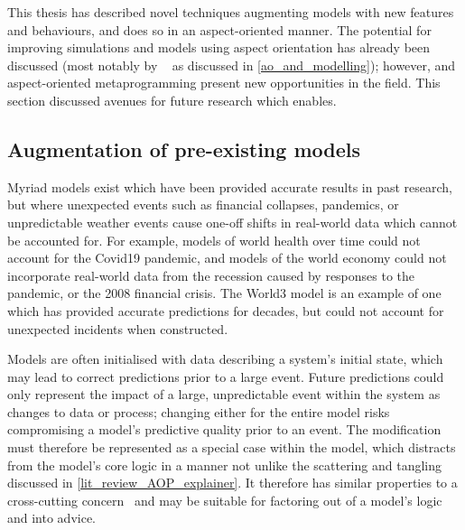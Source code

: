 This thesis has described novel techniques augmenting models with new features
and behaviours, and does so in an aspect-oriented manner. The potential for
improving simulations and models using aspect orientation has already been
discussed (most notably by \citeauthor{gulyas1999use}~\cite{gulyas1999use} as
discussed in \cref{ao_and_modelling}); however, \pdsf and aspect-oriented
metaprogramming present new opportunities in the field. This section discussed
avenues for future research which \pdsf enables.


\subsection{Augmentation of pre-existing models}

Myriad models exist which have been provided accurate results in past research,
but where unexpected events such as financial collapses, pandemics, or
unpredictable weather events cause one-off shifts in real-world data which
cannot be accounted for. For example, models of world health over time could not
account for the Covid19 pandemic, and models of the world economy could not
incorporate real-world data from the recession caused by responses to the
pandemic, or the 2008 financial crisis. The World3 model is an example of one
which has provided accurate predictions for decades, but could not account for unexpected incidents when constructed.

Models are often initialised with data describing a system's initial state,
which may lead to correct predictions prior to a large event. Future predictions
could only represent the impact of a large, unpredictable event within the
system as changes to data or process; changing either for the entire model risks
compromising a model's predictive quality prior to an event. The modification
must therefore be represented as a special case within the model, which
distracts from the model's core logic in a manner not unlike the scattering and
tangling discussed in \cref{lit_review_AOP_explainer}. It therefore has similar
properties to a cross-cutting concern~\cite{kiczales1997aspect} and may be
suitable for factoring out of a model's logic and into advice.

